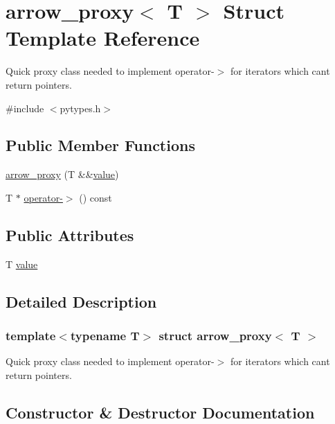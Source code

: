 \hypertarget{structarrow__proxy}{}\section{arrow\+\_\+proxy$<$ T $>$ Struct Template Reference}
\label{structarrow__proxy}


Quick proxy class needed to implement {\ttfamily operator-\/$>$} for iterators which can\textquotesingle{}t return pointers.  




{\ttfamily \#include $<$pytypes.\+h$>$}

\subsection*{Public Member Functions}
\begin{DoxyCompactItemize}
\item 
\mbox{\hyperlink{structarrow__proxy_a5af5df87f6fe57037be0c51da220395d}{arrow\+\_\+proxy}} (T \&\&\mbox{\hyperlink{_s_d_l__opengl__glext_8h_a8ad81492d410ff2ac11f754f4042150f}{value}})
\item 
T $\ast$ \mbox{\hyperlink{structarrow__proxy_aa4af1438adb54bcc3dbf89be8d3e8989}{operator-\/$>$}} () const
\end{DoxyCompactItemize}
\subsection*{Public Attributes}
\begin{DoxyCompactItemize}
\item 
T \mbox{\hyperlink{structarrow__proxy_a710c1d70612055324d70d539eadaaf9d}{value}}
\end{DoxyCompactItemize}


\subsection{Detailed Description}
\subsubsection*{template$<$typename T$>$\newline
struct arrow\+\_\+proxy$<$ T $>$}

Quick proxy class needed to implement {\ttfamily operator-\/$>$} for iterators which can\textquotesingle{}t return pointers. 

\subsection{Constructor \& Destructor Documentation}
\mbox{\label{structarrow__proxy_a5af5df87f6fe57037be0c51da220395d}} 
